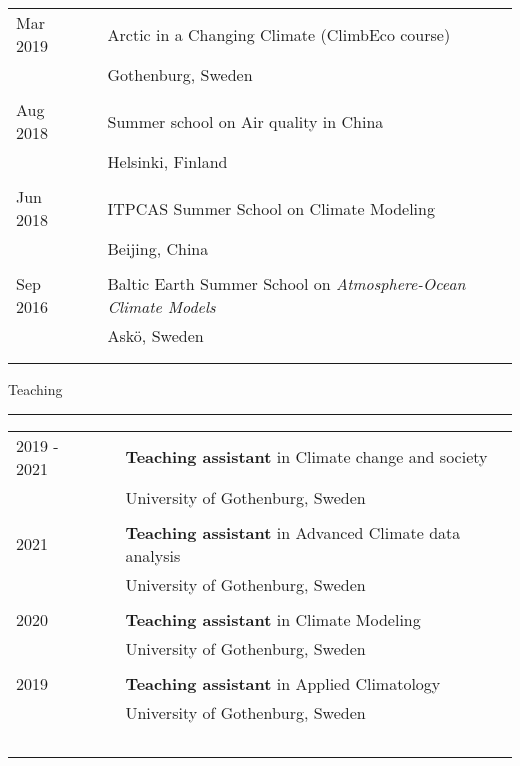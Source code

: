 \documentclass[a4paper,12pt]{article}
\begin{document}
\begin{titlepage}
\begin{table}[h!]
\begin{tabular}{p{3.7cm}p{0.5cm}|p{12.5cm}}
 Mar 2019 && Arctic in a Changing Climate (ClimbEco course)\\
 && Gothenburg, Sweden\\
 &&\\
 Aug 2018 && Summer school on Air quality in China\\
 && Helsinki, Finland \\
 &&\\
 Jun 2018 && ITPCAS Summer School on Climate Modeling\\
 && Beijing, China\\
 &&\\
 Sep 2016 &&  Baltic Earth Summer School on \textit{Atmosphere-Ocean Climate Models} \\
  && Ask\"{o}, Sweden\\
 &&\\

& \\[-1.7ex]
	\end{tabular}
\end{table}

\newpage

\flushleft\large Teaching
\rule{1\textwidth}{0.7pt}
\begin{table}[h!]
  \begin{tabular}{p{3.7cm}p{0.5cm}|p{12.5cm}}
 2019 - 2021 && \textbf{Teaching assistant} in Climate change and society\\
  && University of Gothenburg, Sweden\\
 &&\\
 2021 &&  \textbf{Teaching assistant} in Advanced Climate data analysis \\
  && University of Gothenburg, Sweden\\
 &&\\
 2020 && \textbf{Teaching assistant} in Climate Modeling\\
 && University of Gothenburg, Sweden\\
 &&\\
 2019 && \textbf{Teaching assistant} in Applied Climatology\\
 && University of Gothenburg, Sweden\\\
& \\[-1.7ex]
	\end{tabular}
\end{table}




\end{titlepage}
\end{document}
